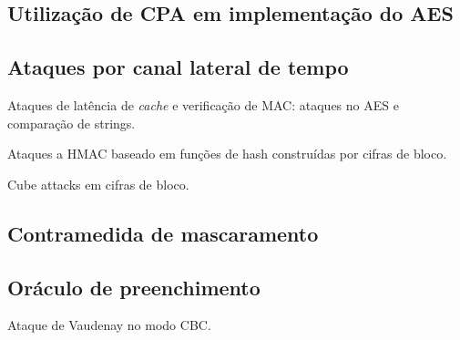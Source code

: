 \subsection{Utilização de CPA em implementação do AES}

\subsection{Ataques por canal lateral de tempo}

Ataques de latência de \emph{cache} e verificação de MAC:
ataques no AES e comparação de strings.

Ataques a HMAC baseado em funções de hash construídas por cifras de bloco.

Cube attacks em cifras de bloco.

\subsection{Contramedida de mascaramento}



\subsection{Oráculo de preenchimento}

Ataque de Vaudenay no modo CBC.